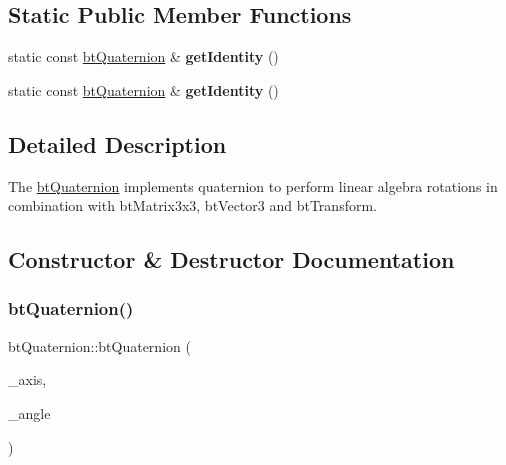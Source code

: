 \subsection*{Static Public Member Functions}
\begin{DoxyCompactItemize}
\item 
\mbox{\label{classbtQuaternion_a68fec9bc7f3ce9fee2a7412927b04ffe}} 
static const \hyperlink{classbtQuaternion}{bt\+Quaternion} \& {\bfseries get\+Identity} ()
\item 
\mbox{\label{classbtQuaternion_a68fec9bc7f3ce9fee2a7412927b04ffe}} 
static const \hyperlink{classbtQuaternion}{bt\+Quaternion} \& {\bfseries get\+Identity} ()
\end{DoxyCompactItemize}


\subsection{Detailed Description}
The \hyperlink{classbtQuaternion}{bt\+Quaternion} implements quaternion to perform linear algebra rotations in combination with bt\+Matrix3x3, bt\+Vector3 and bt\+Transform. 

\subsection{Constructor \& Destructor Documentation}
\mbox{\label{classbtQuaternion_a2b2e9ed0014eb26ed076808fb76e9d69}} 
\subsubsection{\texorpdfstring{bt\+Quaternion()}{btQuaternion()}\hspace{0.1cm}{\footnotesize\ttfamily [1/4]}}
{\footnotesize\ttfamily bt\+Quaternion\+::bt\+Quaternion (\begin{DoxyParamCaption}\item[{const bt\+Vector3 \&}]{\+\_\+axis,  }\item[{const bt\+Scalar \&}]{\+\_\+angle }\end{DoxyParamCaption})\hspace{0.3cm}{\ttfamily [inline]}}



